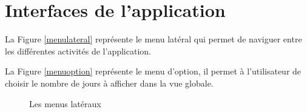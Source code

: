\section*{Interfaces de l'application}

La Figure \ref{menulateral} repr\'esente le menu lat\'eral qui permet de naviguer entre les diff\'erentes activit\'es de l'application.

La Figure \ref{menuoption} repr\'esente le menu d'option, il permet \`a l'utilisateur de choisir le nombre de jours \`a afficher dans la vue globale.
\begin{figure}[H]
\centering
	
		
	\caption{Les menus lat\'eraux}
	\label{home}
	
\end{figure}
